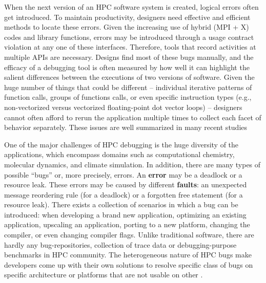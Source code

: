 When the next version of an HPC software system is created, logical errors often get introduced.
%
To maintain productivity, designers need effective and efficient methods to locate these errors.
%
Given the increasing use of hybrid (MPI + X) codes and library functions, errors may be introduced through a usage contract violation at any one of these interfaces.
%
Therefore, tools that record activities at multiple APIs are necessary.
%
Designs find most of these bugs manually, and the efficacy of a debugging tool is
often measured by how well it can highlight the salient differences between the
executions of two versions of software.
%
Given the huge number of things that could be different -- individual iterative
patterns of function calls, groups of functions calls, or even specific instruction
types (e.g., non-vectorized versus vectorized floating-point dot vector loops) -- designers
cannot often afford to rerun the application multiple times to collect each facet
of behavior separately.
%
These issues are well summarized in many recent studies \cite{hpcdoe}



One of the major challenges of HPC debugging is the huge diversity of the applications, which encompass domains such as computational chemistry, molecular dynamics, and climate simulation.
%
In addition, there are many types of possible “bugs” or, more precisely, errors. An \textbf{error} may be a deadlock or a resource leak. These errors may be caused by different \textbf{faults}: an unexpected message reordering rule (for a deadlock) or a forgotten free statement (for a resource leak).
%
There exists a collection of scenarios in which a bug can be introduced: when developing a brand new application, optimizing an existing application, upscaling an application, porting to a new platform, changing the compiler, or even changing compiler flags.
%
Unlike traditional software, there are hardly any bug-repositories, collection of trace data or debugging-purpose benchmarks in HPC community.
The heterogeneous nature of HPC bugs make developers come up with their own solutions to resolve specific class of bugs on specific architecture or platforms that are not usable on other \cite{hpcdoe}.

%


